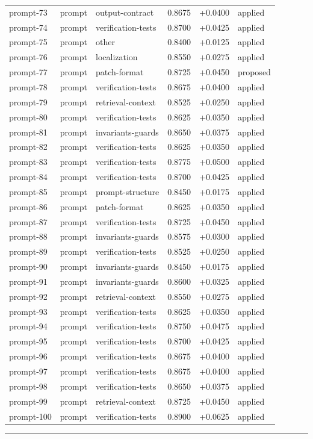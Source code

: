 \begin{center}
\begin{longtable}{llp{5.2cm}rrl}
prompt-73 & prompt & output-contract & 0.8675 & +0.0400 & applied \\
prompt-74 & prompt & verification-tests & 0.8700 & +0.0425 & applied \\
prompt-75 & prompt & other & 0.8400 & +0.0125 & applied \\
prompt-76 & prompt & localization & 0.8550 & +0.0275 & applied \\
prompt-77 & prompt & patch-format & 0.8725 & +0.0450 & proposed \\
prompt-78 & prompt & verification-tests & 0.8675 & +0.0400 & applied \\
prompt-79 & prompt & retrieval-context & 0.8525 & +0.0250 & applied \\
prompt-80 & prompt & verification-tests & 0.8625 & +0.0350 & applied \\
prompt-81 & prompt & invariants-guards & 0.8650 & +0.0375 & applied \\
prompt-82 & prompt & verification-tests & 0.8625 & +0.0350 & applied \\
prompt-83 & prompt & verification-tests & 0.8775 & +0.0500 & applied \\
prompt-84 & prompt & verification-tests & 0.8700 & +0.0425 & applied \\
prompt-85 & prompt & prompt-structure & 0.8450 & +0.0175 & applied \\
prompt-86 & prompt & patch-format & 0.8625 & +0.0350 & applied \\
prompt-87 & prompt & verification-tests & 0.8725 & +0.0450 & applied \\
prompt-88 & prompt & invariants-guards & 0.8575 & +0.0300 & applied \\
prompt-89 & prompt & verification-tests & 0.8525 & +0.0250 & applied \\
prompt-90 & prompt & invariants-guards & 0.8450 & +0.0175 & applied \\
prompt-91 & prompt & invariants-guards & 0.8600 & +0.0325 & applied \\
prompt-92 & prompt & retrieval-context & 0.8550 & +0.0275 & applied \\
prompt-93 & prompt & verification-tests & 0.8625 & +0.0350 & applied \\
prompt-94 & prompt & verification-tests & 0.8750 & +0.0475 & applied \\
prompt-95 & prompt & verification-tests & 0.8700 & +0.0425 & applied \\
prompt-96 & prompt & verification-tests & 0.8675 & +0.0400 & applied \\
prompt-97 & prompt & verification-tests & 0.8675 & +0.0400 & applied \\
prompt-98 & prompt & verification-tests & 0.8650 & +0.0375 & applied \\
prompt-99 & prompt & retrieval-context & 0.8725 & +0.0450 & applied \\
prompt-100 & prompt & verification-tests & 0.8900 & +0.0625 & applied \\
\bottomrule\end{longtable}\end{center}
\par\bigskip\hrule\bigskip
